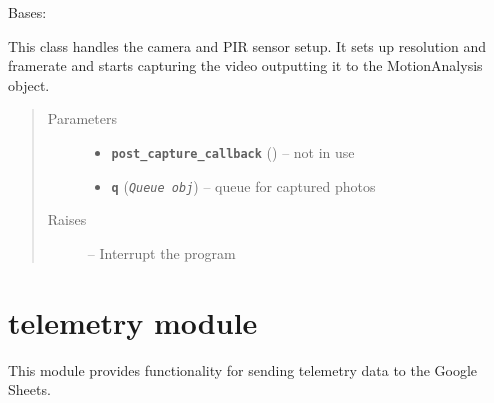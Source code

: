 \documentclass[letterpaper,10pt,english,openany]{sphinxmanual}
\begin{document}
\begin{fulllineitems}
\label{rpicameramon:rpicameramon.motion.PiMotion}
Bases: 

This class handles the camera and PIR sensor setup.
It sets up resolution and framerate and starts
capturing the video outputting it to the MotionAnalysis object.
\begin{quote}\begin{description}
\item[{Parameters}] \leavevmode\begin{itemize}
\item {} 
\textbf{\texttt{post\_capture\_callback}} ({\hyperref[rpicameramon:rpicameramon.motion.CaptureHandler.callback]{}}) -- not in use

\item {} 
\textbf{\texttt{q}} (\emph{\texttt{Queue obj}}) -- queue for captured photos

\end{itemize}

\item[{Raises}] \leavevmode
{} -- Interrupt the program

\end{description}\end{quote}

\begin{fulllineitems}
\label{rpicameramon:rpicameramon.motion.PiMotion.start}
\end{fulllineitems}


\end{fulllineitems}



\chapter{telemetry module}
\label{rpicameramon:telemetry-module}
This module provides functionality for sending telemetry data to the Google Sheets.
\label{rpicameramon:module-rpicameramon.telemetry}
\end{document}
